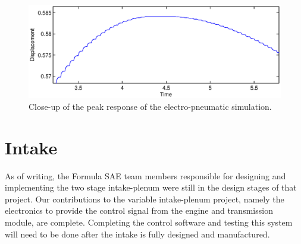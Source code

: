 \begin{figure}[H]
 \centering
 \includegraphics[width=5in,keepaspectratio]{results/figures/electro-pneumatic_simulation_plot2.eps}
 \caption{Close-up of the peak response of the electro-pneumatic simulation.}
 \label{fig:pneumatic_sim_zoom}
\end{figure}

\section{Intake}

As of writing, the Formula SAE team members responsible for designing and implementing the two stage intake-plenum were still in the design stages of that project. Our contributions to the variable intake-plenum project, namely the electronics to provide the control signal from the engine and transmission module, are complete. Completing the control software and testing this system will need to be done after the intake is fully designed and manufactured.
